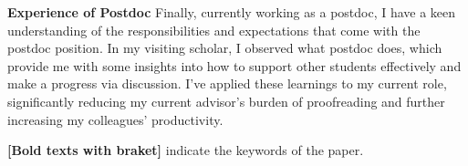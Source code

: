 \documentclass[11pt, a4paper]{../awesome-cv}
\begin{document}
\begin{cvletter}
\textbf{Experience of Postdoc} Finally, currently working as a postdoc, I have a keen understanding of the responsibilities and expectations that come with the postdoc position.
In my visiting scholar, I observed what postdoc does, which provide me with some insights into how to support other students effectively and make a progress via discussion.
I've applied these learnings to my current role, significantly reducing my current advisor's burden of proofreading and further increasing my colleagues' productivity.

\newcommand{\hyungtaelim}{\underline{Hyungtae Lim}}


\textbf{[Bold texts with braket]} indicate the keywords of the paper.


\end{cvletter}
\end{document}
